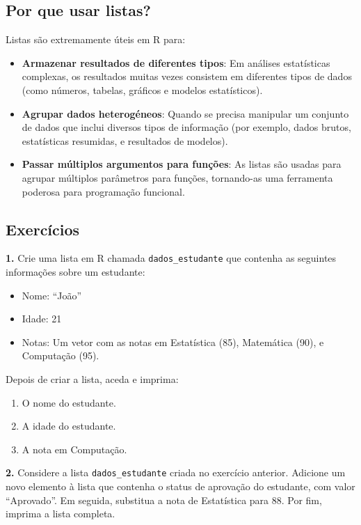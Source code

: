 \documentclass[
]{book}
\providecommand{\tightlist}{%
  \setlength{\itemsep}{0pt}\setlength{\parskip}{0pt}}
\begin{document}
\subsection{Por que usar listas?}\label{por-que-usar-listas}

Listas são extremamente úteis em R para:

\begin{itemize}
\tightlist
\item
  \textbf{Armazenar resultados de diferentes tipos}: Em análises
  estatísticas complexas, os resultados muitas vezes consistem em
  diferentes tipos de dados (como números, tabelas, gráficos e modelos
  estatísticos).
\item
  \textbf{Agrupar dados heterogéneos}: Quando se precisa manipular um
  conjunto de dados que inclui diversos tipos de informação (por
  exemplo, dados brutos, estatísticas resumidas, e resultados de
  modelos).
\item
  \textbf{Passar múltiplos argumentos para funções}: As listas são usadas
  para agrupar múltiplos parâmetros para funções, tornando-as uma
  ferramenta poderosa para programação funcional.
\end{itemize}

\subsection{Exercícios}\label{exercuxedcios-5}

\textbf{1.} Crie uma lista em R chamada \texttt{dados\_estudante} que contenha as
seguintes informações sobre um estudante:

\begin{itemize}
\tightlist
\item
  Nome: ``João''
\item
  Idade: 21
\item
  Notas: Um vetor com as notas em Estatística (85), Matemática (90), e
  Computação (95).
\end{itemize}

Depois de criar a lista, aceda e imprima:

\begin{enumerate}
\def\labelenumi{\arabic{enumi}.}
\tightlist
\item
  O nome do estudante.
\item
  A idade do estudante.
\item
  A nota em Computação.
\end{enumerate}

\textbf{2.} Considere a lista \texttt{dados\_estudante} criada no exercício anterior.
Adicione um novo elemento à lista que contenha o status de aprovação do
estudante, com valor ``Aprovado''. Em seguida, substitua a nota de
Estatística para 88. Por fim, imprima a lista completa.
\end{document}
